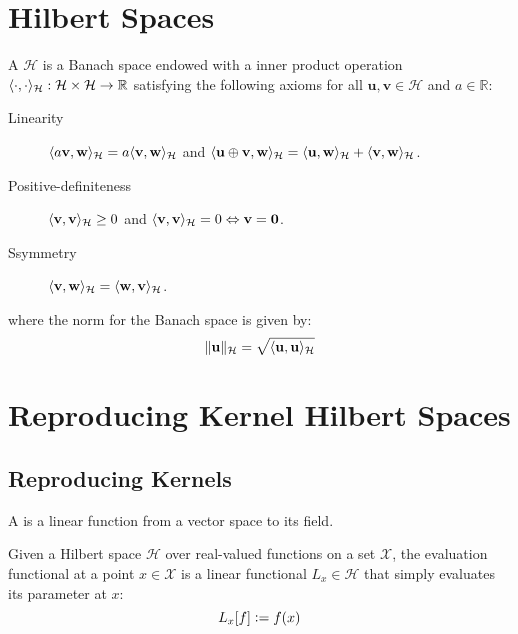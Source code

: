 \section{Hilbert Spaces}

\begin{definition}
A  $\mathcal{H}$ is a Banach space endowed with a inner product operation $\langle\cdot, \cdot\rangle_\mathcal{H} : \mathcal{H} \times \mathcal{H} \to \mathbb{R}$ satisfying the following axioms for all $\mathbf{u}, \mathbf{v} \in \mathcal{H}$ and $a \in \mathbb{R}$:
%
\begin{description}
  \item[Linearity] $\langle a \mathbf{v}, \mathbf{w}\rangle_\mathcal{H} = a \langle\mathbf{v}, \mathbf{w}\rangle_\mathcal{H}$ and $\langle\mathbf{u} \oplus \mathbf{v}, \mathbf{w}\rangle_\mathcal{H} = \langle\mathbf{u}, \mathbf{w}\rangle_\mathcal{H} + \langle\mathbf{v}, \mathbf{w}\rangle_\mathcal{H}$.
  \item[Positive-definiteness] $\langle\mathbf{v}, \mathbf{v}\rangle_\mathcal{H} \geq 0$ and $\langle\mathbf{v}, \mathbf{v}\rangle_\mathcal{H} = 0 \Leftrightarrow \mathbf{v} = \mathbf{0}$.
  \item[Ssymmetry] $\langle\mathbf{v}, \mathbf{w}\rangle_\mathcal{H} = \langle\mathbf{w}, \mathbf{v}\rangle_\mathcal{H}$.
\end{description}
%
where the norm for the Banach space is given by:
%
\begin{equation}
  \lVert\mathbf{u}\rVert_\mathcal{H} = \sqrt{\langle\mathbf{u}, \mathbf{u}\rangle_\mathcal{H}}
\end{equation}
%
\end{definition}

\section{Reproducing Kernel Hilbert Spaces}

\subsection{Reproducing Kernels}
A  is a linear function from a vector space to its field.

\begin{definition}
Given a Hilbert space $\mathcal{H}$ over real-valued functions on a set $\mathcal{X}$, the evaluation functional at a point $x \in \mathcal{X}$ is a linear functional $L_x \in \mathcal{H}$ that simply evaluates its parameter at $x$:
\begin{equation}
  L_x[f] \vcentcolon= f(x)
\end{equation}
\end{definition}

